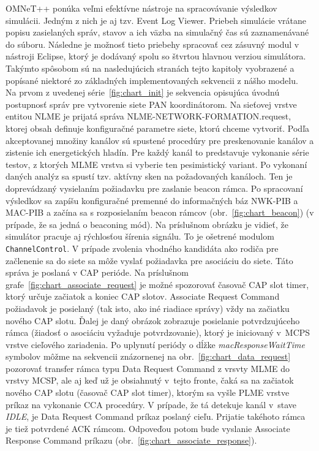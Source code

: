 \indent OMNeT++ ponúka veľmi efektívne nástroje na spracovávanie výsledkov simulácii. Jedným z nich je aj tzv. Event Log Viewer. Priebeh simulácie vrátane popisu zasielaných správ, stavov a ich väzba na simulačný čas sú zaznamenávané do súboru. Následne je možnosť tieto priebehy spracovať cez zásuvný modul v nástroji Eclipse, ktorý je dodávaný spolu so štvrtou hlavnou verziou simulátora. Takýmto spôsobom sú na nasledujúcich stranách tejto kapitoly vyobrazené a popísané niektoré zo základných implementovaných sekvencii z nášho modelu.\\
\indent Na prvom z uvedenej série~\ref{fig:chart_init} je sekvencia opisujúca úvodnú postupnosť správ pre vytvorenie siete PAN koordinátorom. Na sieťovej vrstve entitou {NLME je prijatá správa NLME-NETWORK-FORMATION.request, ktorej obsah definuje konfiguračné parametre siete, ktorú chceme vytvoriť. Podľa akceptovanej množiny kanálov sú spustené procedúry pre preskenovanie kanálov a zistenie ich energetických hladín. Pre každý kanál to predstavuje vykonanie série testov, z ktorých MLME vrstva si vyberie ten pesimistický variant. Po vykonaní daných analýz sa spustí tzv. aktívny sken na požadovaných kanáloch. Ten je doprevádzaný vysielaním požiadavku pre zaslanie beacon rámca. Po spracovaní výsledkov sa zapíšu konfiguračné premenné do informačných báz NWK-PIB a MAC-PIB a začína sa s rozposielaním beacon rámcov (obr.~\ref{fig:chart_beacon}) (v prípade, že sa jedná o beaconing mód). Na príslušnom obrázku je vidieť, že simulátor pracuje aj rýchlosťou šírenia signálu. To je ošetrené modulom \texttt{ChannelControl}. V prípade zvolenia vhodného kandidáta ako rodiča pre začlenenie sa do siete sa môže vyslať požiadavka pre asociáciu do siete. Táto správa je poslaná v CAP perióde. Na príslušnom grafe~\ref{fig:chart_associate_request} je možné spozorovať časovač CAP slot timer, ktorý určuje začiatok a koniec CAP slotov. Asso\-ciate Request Command požiadavok je posielaný (tak isto, ako iné riadiace správy) vždy na začiatku nového CAP slotu. Ďalej je daný obrázok zobrazuje posielanie potvrdzujúceho rámca (žiadosť o asociáciu vyžaduje potvrdzovanie), ktorý je iniciovaný v~MCPS vrstve cieľového zariadenia. Po uplynutí periódy o dĺžke \textit{macResponseWaitTime} symbolov môžme na sekvencii znázornenej na obr.~\ref{fig:chart_data_request} pozorovať transfer rámca typu Data Request Command z vrsvty MLME do vrstvy MCSP, ale aj keď už je obsiahnutý v~tejto fronte, čaká sa na začiatok nového CAP slotu (časovač CAP slot timer), ktorým sa vyšle PLME vrstve príkaz na vykonanie CCA procedúry. V prípade, že tá detekuje kanál v~stave \textit{IDLE}, je Data Request Command príkaz poslaný cieľu. Prijatie takéhoto rámca je tiež potvrdené ACK rámcom. Odpoveďou potom bude vyslanie Associate Response Command príkazu (obr.~\ref{fig:chart_associate_response}).\\
}
